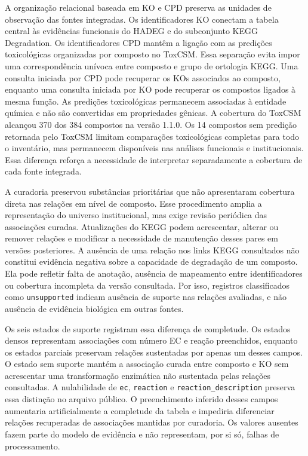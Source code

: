 A organização relacional baseada em KO e CPD preserva as unidades de
observação das fontes integradas. Os identificadores KO conectam a tabela
central às evidências funcionais do HADEG e do subconjunto KEGG Degradation.
Os identificadores CPD mantêm a ligação com as predições toxicológicas
organizadas por composto no ToxCSM. Essa separação evita impor uma correspondência unívoca entre composto e grupo
de ortologia KEGG. Uma consulta iniciada por CPD pode recuperar os KOs
associados ao composto, enquanto uma consulta iniciada por KO pode recuperar
os compostos ligados à mesma função. As predições toxicológicas permanecem
associadas à entidade química e não são convertidas em propriedades gênicas. A cobertura do ToxCSM alcançou 370 dos 384 compostos na versão 1.1.0. Os
14 compostos sem predição retornada pelo ToxCSM limitam comparações toxicológicas completas para
todo o inventário, mas permanecem disponíveis nas análises funcionais e
institucionais. Essa diferença reforça a necessidade de interpretar
separadamente a cobertura de cada fonte integrada.

A curadoria preservou substâncias prioritárias que não apresentaram cobertura
direta nas relações em nível de composto. Esse procedimento amplia a
representação do universo institucional, mas exige revisão periódica das
associações curadas. Atualizações do KEGG podem acrescentar, alterar ou remover
relações e modificar a necessidade de manutenção desses pares em versões
posteriores. A ausência de uma relação nos links KEGG consultados não constitui evidência
negativa sobre a capacidade de degradação de um composto. Ela pode refletir
falta de anotação, ausência de mapeamento entre identificadores ou cobertura
incompleta da versão consultada. Por isso, registros classificados como
\texttt{unsupported} indicam ausência de suporte nas relações avaliadas, e
não ausência de evidência biológica em outras fontes.

Os seis estados de suporte registram essa diferença de completude. Os estados
densos representam associações com número EC e reação preenchidos, enquanto
os estados parciais preservam relações sustentadas por apenas um desses
campos. O estado sem suporte mantém a associação curada entre composto e KO
sem acrescentar uma transformação enzimática não sustentada pelas relações
consultadas. A nulabilidade de \texttt{ec}, \texttt{reaction} e
\texttt{reaction\_description} preserva essa distinção no arquivo público. O
preenchimento inferido desses campos aumentaria artificialmente a completude
da tabela e impediria diferenciar relações recuperadas de associações
mantidas por curadoria. Os valores ausentes fazem parte do modelo de evidência
e não representam, por si só, falhas de processamento.

